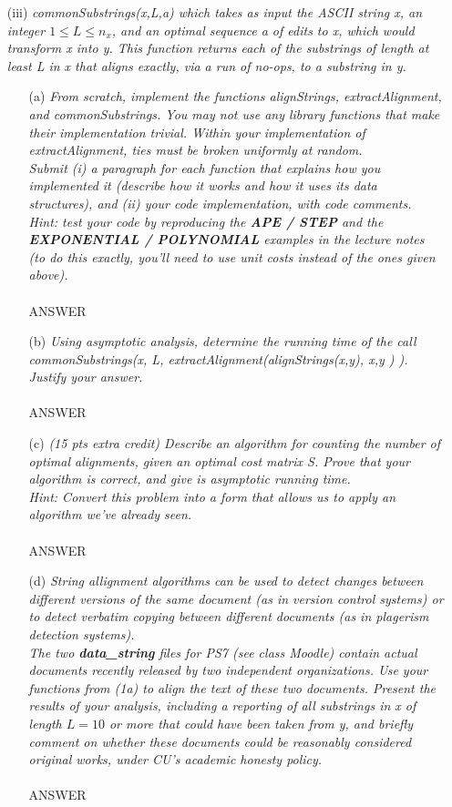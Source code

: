 \documentclass[12pt]{article}
\begin{document}
{\begin{enumerate}
\item[(iii)] \textit{commonSubstrings(x,L,a) which takes as input the ASCII string x, an integer $1 \leq L \leq n_x$, and an optimal sequence a of edits to x, which would transform x into y. This function returns each of the substrings of length at least L in x that aligns exactly, via a run of no-ops, to a substring in y.}
\begin{enumerate}
\item[(a)] \textit{From scratch, implement the functions alignStrings, extractAlignment, and commonSubstrings. You may not use any library functions that make their implementation trivial. Within your implementation of extractAlignment, ties must be broken uniformly at random.\\
Submit (i) a paragraph for each function that explains how you implemented it (describe how it works and how it uses its data structures), and (ii) your code implementation, with code comments.\\
Hint: test your code by reproducing the \textbf{APE / STEP} and the \textbf{EXPONENTIAL / POLYNOMIAL} examples in the lecture notes (to do this exactly, you'll need to use unit costs instead of the ones given above).}
\\\\
ANSWER
\\
\item[(b)] \textit{Using asymptotic analysis, determine the running time of the call commonSubstrings(x, L, extractAlignment(alignStrings(x,y), x,y ) ). Justify your answer.}
\\\\
ANSWER
\\
\item[(c)] \textit{(15 pts extra credit) Describe an algorithm for counting the number of optimal alignments, given an optimal cost matrix S. Prove that your algorithm is correct, and give is asymptotic running time.\\
Hint: Convert this problem into a form that allows us to apply an algorithm we've already seen.}
\\\\
ANSWER
\\
\item[(d)] \textit{String allignment algorithms can be used to detect changes between different versions of the same document (as in version control systems) or to detect verbatim copying between different documents (as in plagerism detection systems).\\
The two \textbf{data\_string} files for PS7 (see class Moodle) contain actual documents recently released by two independent organizations. Use your functions from (1a) to align the text of these two documents. Present the results of your analysis, including a reporting of all substrings in x of length $L=10$ or more that could have been taken from y, and briefly comment on whether these documents could be reasonably considered original works, under CU's academic honesty policy.}
\\\\
ANSWER
\\
\end{enumerate}
\endgroup


\end{enumerate}}
\end{document}
